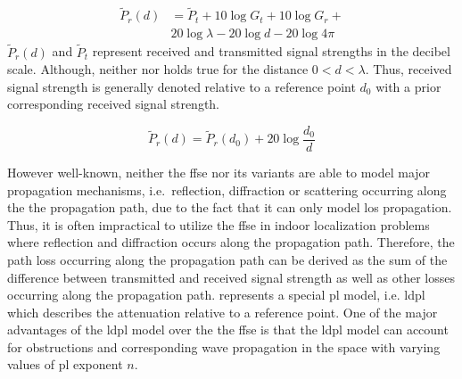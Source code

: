     \begin{equation}
      \begin{split}
        \label{eq:friisdBm}
        \widetilde{P}_r(d) &= \widetilde{P}_t + 10 \log{G_t} + 10 \log{G_r} + \\
        & 20 \log{\lambda} - 20 \log{d} - 20 \log{4 \pi}
      \end{split}
    \end{equation}
    $\widetilde{P}_r(d)$ and $\widetilde{P}_t$ represent received and transmitted signal strengths in the decibel scale.
    Although, neither  nor  holds true for the distance $0<d<\lambda$.
    Thus, received signal strength is generally denoted relative to a reference point $d_0$ with a prior corresponding received signal strength.

    \begin{equation}
        \label{eq:friisRef}
        \widetilde{P}_r(d) = \widetilde{P}_r(d_0) + 20 \log{\dfrac{d_0}{d}}
    \end{equation}


    However well-known, neither the \gls{ffse} nor its variants are able to model major propagation mechanisms, i.e.\ reflection, diffraction or scattering occurring along the the propagation path, due to the fact that it can only model \gls{los} propagation.
    Thus, it is often impractical to utilize the \gls{ffse} in indoor localization problems where reflection and diffraction occurs along the propagation path.
    Therefore, the path loss occurring along the propagation path can be derived as the sum of the difference between transmitted and received signal strength as well as other losses occurring along the propagation path.
     represents a special \gls{pl} model, i.e. \gls{ldpl} which describes the attenuation relative to a reference point.
    One of the major advantages of the \gls{ldpl} model over the the \gls{ffse} is that the \gls{ldpl} model can account for obstructions and corresponding wave propagation in the space with varying values of \gls{pl} exponent $n$.


